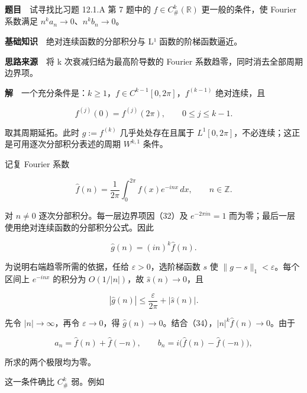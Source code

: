\documentclass[11pt,a4paper]{article}
\begin{document}
\textbf{题目}　试寻找比习题 12.1.A 第 7 题中的
\(f\in C_\#^k(\mathbb R)\) 更一般的条件，使 Fourier 系数满足
\(n^ka_n\to0\)、\(n^kb_n\to0\)。

\textbf{基础知识}　绝对连续函数的分部积分与 L¹ 函数的阶梯函数逼近。

\textbf{思路来源}　将 k 次衰减归结为最高阶导数的 Fourier
系数趋零，同时消去全部周期边界项。

\textbf{解}　一个充分条件是：\(k\ge1\)，\(f\in C^{k-1}[0,2\pi]\)，\(f^{(k-1)}\)
绝对连续，且

\begin{equation}
f^{(j)}(0)=f^{(j)}(2\pi),\qquad 0\le j\le k-1.
\tag{32}
\end{equation}

取其周期延拓。此时 \(g:=f^{(k)}\) 几乎处处存在且属于
\(L^1[0,2\pi]\)，不必连续；这正是可用逐次分部积分表述的周期 \(W^{k,1}\)
条件。

记复 Fourier 系数

\begin{equation}
\widehat f(n)=\frac1{2\pi}\int_0^{2\pi}f(x)e^{-inx}\,dx,
\qquad n\in\mathbb Z.
\tag{33}
\end{equation}

对 \(n\ne0\) 逐次分部积分。每一层边界项因（32）及 \(e^{-2\pi in}=1\)
而为零；最后一层使用绝对连续函数的分部积分公式。因此

\begin{equation}
\widehat g(n)=(in)^k\widehat f(n).
\tag{34}
\end{equation}

为说明右端趋零所需的依据，任给 \(\varepsilon>0\)，选阶梯函数 \(s\) 使
\(\|g-s\|_1<\varepsilon\)。每个区间上 \(e^{-inx}\) 的积分为
\(O(1/|n|)\)，故 \(\widehat s(n)\to0\)，且

\begin{equation}
|\widehat g(n)|\le\frac{\varepsilon}{2\pi}+|\widehat s(n)|.
\tag{35}
\end{equation}

先令 \(|n|\to\infty\)，再令 \(\varepsilon\to0\)，得
\(\widehat g(n)\to0\)。结合（34），\(|n|^k\widehat f(n)\to0\)。由于

\begin{equation}
a_n=\widehat f(n)+\widehat f(-n),\qquad
b_n=i\bigl(\widehat f(n)-\widehat f(-n)\bigr),
\tag{36}
\end{equation}

所求的两个极限均为零。

这一条件确比 \(C_\#^k\) 弱。例如
\end{document}
